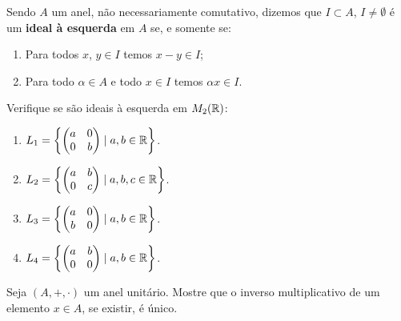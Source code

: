 \documentclass[12pt]{exam}
\begin{document}
\vspace{.3cm}

\questao{} Sendo $A$ um anel, não necessariamente comutativo, dizemos que $I \subset A$, $I \ne \emptyset$ é um \textbf{ideal à esquerda} em $A$ se, e somente se:
\begin{enumerate}[label=({\roman*})]
    \item Para todos $x$, $y \in I$ temos $x - y \in I$;

    \item Para todo $\alpha \in A$ e todo $x \in I$ temos $\alpha x \in I$.
\end{enumerate}

Verifique se são ideais à esquerda em $M_2(\mathbb{R})$:
\begin{enumerate}[label=({\alph*})]
    \item $L_1 = \left\{\begin{pmatrix}
        a & 0\\
        0 & b
    \end{pmatrix} \mid a, b \in \mathbb{R}\right\}$.

    \item $L_2 = \left\{\begin{pmatrix}
        a & b\\
        0 & c
    \end{pmatrix} \mid a, b, c \in \mathbb{R}\right\}$.

    \item $L_3 = \left\{\begin{pmatrix}
        a & 0\\
        b & 0
    \end{pmatrix} \mid a, b \in \mathbb{R}\right\}$.

    \item $L_4 = \left\{\begin{pmatrix}
        a & b\\
        0 & 0
    \end{pmatrix} \mid a, b \in \mathbb{R}\right\}$.
\end{enumerate}

\vspace{.3cm}

\questao{}  Seja $(A, +, \cdot)$ um anel unitário. Mostre que o inverso multiplicativo de um elemento $x \in A$, se existir, é único.

\vspace{.3cm}
\end{document}

